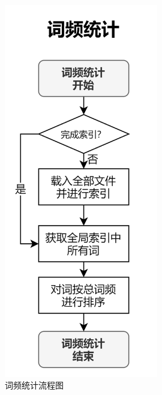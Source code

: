\documentclass[scheme = chinese]{ctexart}
\begin{document}
\begin{figure}[h]
    \centering
    \begin{minipage}[t]{0.48\textwidth}
        \centering
        \includegraphics[width=0.6\textwidth]{images/dsacd-流程图-词频统计.drawio.png}
        \caption{词频统计流程图}
    \end{minipage}
    \begin{minipage}[t]{0.48\textwidth}
        \centering

\end{minipage}
\end{figure}
\end{document}
